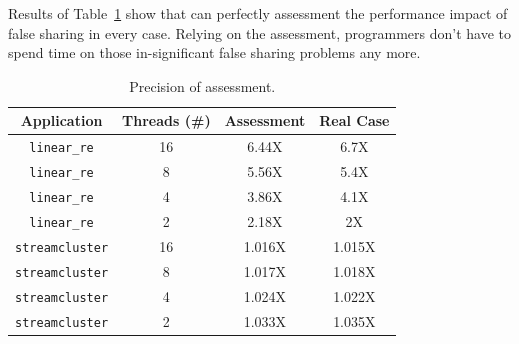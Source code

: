 Results of Table~\ref{tbl: precision} show that \cheetah{} can perfectly assessment the performance impact of false sharing in every case. Relying on the assessment, programmers don't have to spend time on those in-significant false sharing problems any more. 


\begin{table}
  \small
  \centering
  \begin{tabular}{ c | c | c | c}
  \textbf{Application} & {Threads (\#)} & \textbf{Assessment} & \textbf{Real Case} \\ \hline
\texttt{linear\_re} & 16 & 6.44X    & 6.7X \\
\texttt{linear\_re}& 8  & 5.56X    & 5.4X \\
\texttt{linear\_re} & 4  & 3.86X  & 4.1X  \\
 \texttt{linear\_re}& 2  & 2.18X  & 2X    \\ \hline
 \texttt{streamcluster} & 16 & 1.016X    & 1.015X \\
 \texttt{streamcluster} & 8 & 1.017X    & 1.018X \\
 \texttt{streamcluster} & 4 & 1.024X    & 1.022X \\
 \texttt{streamcluster} & 2 & 1.033X    & 1.035X \\
\end{tabular}
  \caption{
    Precision of assessment. \label{tbl: precision}}
\end{table}

